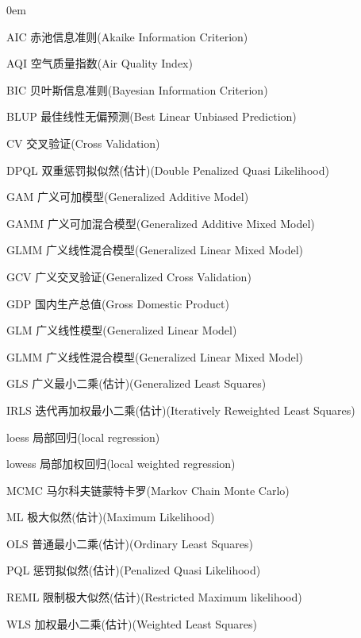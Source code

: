 \begin{denotation}
\itemsep 0em

\item [AIC] 赤池信息准则(Akaike Information Criterion)
\item [AQI] 空气质量指数(Air Quality Index)
\item [BIC] 贝叶斯信息准则(Bayesian Information Criterion)
\item [BLUP] 最佳线性无偏预测(Best Linear Unbiased Prediction)
\item [CV] 交叉验证(Cross Validation)
\item [DPQL] 双重惩罚拟似然(估计)(Double Penalized Quasi Likelihood)
\item [GAM] 广义可加模型(Generalized Additive Model)
\item [GAMM] 广义可加混合模型(Generalized Additive Mixed Model)
\item [GLMM] 广义线性混合模型(Generalized Linear Mixed Model)
\item [GCV] 广义交叉验证(Generalized Cross Validation)
\item [GDP] 国内生产总值(Gross Domestic Product)
\item [GLM] 广义线性模型(Generalized Linear Model)
\item [GLMM] 广义线性混合模型(Generalized Linear Mixed Model)
\item [GLS] 广义最小二乘(估计)(Generalized Least Squares)
\item [IRLS] 迭代再加权最小二乘(估计)(Iteratively Reweighted Least Squares)
\item [loess] 局部回归(local regression)
\item [lowess] 局部加权回归(local weighted regression)
\item [MCMC] 马尔科夫链蒙特卡罗(Markov Chain Monte Carlo)
\item [ML] 极大似然(估计)(Maximum Likelihood)
\item [OLS] 普通最小二乘(估计)(Ordinary Least Squares)
\item [PQL] 惩罚拟似然(估计)(Penalized Quasi Likelihood)
\item [REML] 限制极大似然(估计)(Restricted Maximum likelihood)
\item [WLS] 加权最小二乘(估计)(Weighted Least Squares)

\end{denotation}
